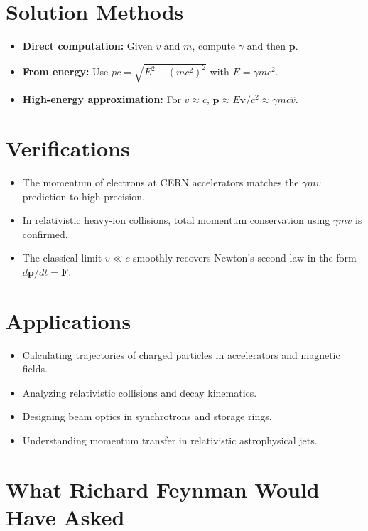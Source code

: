 \section*{Solution Methods}

\begin{itemize}
    \item \textbf{Direct computation:} Given $v$ and $m$, compute $\gamma$ and then $\mathbf{p}$.
    \item \textbf{From energy:} Use $pc = \sqrt{E^2 - (mc^2)^2}$ with $E = \gamma mc^2$.
    \item \textbf{High-energy approximation:} For $v \approx c$, $\mathbf{p} \approx E\mathbf{v}/c^2 \approx \gamma mc \hat{v}$.
\end{itemize}
\section*{Verifications}

\begin{itemize}
    \item The momentum of electrons at CERN accelerators matches the $\gamma m v$ prediction to high precision.
    \item In relativistic heavy-ion collisions, total momentum conservation using $\gamma m v$ is confirmed.
    \item The classical limit $v \ll c$ smoothly recovers Newton's second law in the form $d\mathbf{p}/dt = \mathbf{F}$.
\end{itemize}
\section*{Applications}

\begin{itemize}
    \item Calculating trajectories of charged particles in accelerators and magnetic fields.
    \item Analyzing relativistic collisions and decay kinematics.
    \item Designing beam optics in synchrotrons and storage rings.
    \item Understanding momentum transfer in relativistic astrophysical jets.
\end{itemize}
\section*{What Richard Feynman Would Have Asked}


